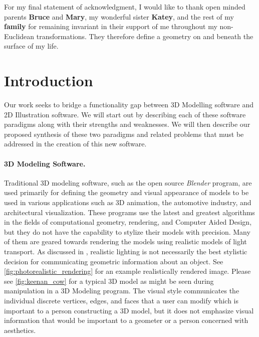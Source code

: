 \documentclass[12pt, letterpaper]{article}
\begin{document}
For my final statement of acknowledgment, I would like to thank open minded parents \textbf{Bruce} and \textbf{Mary},
my wonderful sister \textbf{Katey}, and the rest of my \textbf{family} for remaining
invariant in their support of me throughout my non-Euclidean transformations. They therefore define a geometry on and beneath the surface of my life.


\newpage
\doublespacing
\tableofcontents
\newpage

\setcounter{page}{1}


\section{Introduction}

	Our work seeks to bridge a functionality gap between 3D Modelling software and 2D Illustration software. We will start out by describing each of these
	software paradigms along with their strengths and weaknesses. We will then describe our proposed synthesis of these two paradigms and related problems
	that must be addressed in the creation of this new software.


	\paragraph{3D Modeling Software.}

	Traditional 3D modeling software, such as the open source \emph{Blender} program, are used primarily for defining the geometry and visual appearance of models to be 
	used in various applications such as 3D animation, the automotive industry, and architectural visualization.
	These programs use the latest and greatest algorithms in the fields of computational geometry, rendering, and Computer Aided Design,
	but they do not have the capability to stylize their models with precision. Many of them are geared towards rendering the models using 
	realistic models of light transport. As discussed in \cite{JDA08}, realistic lighting is not necessarily the best stylistic decision for communicating
	geometric information about an object. See \ref{fig:photorealistic_rendering} for an example realistically rendered image.
	Please see \ref{fig:keenan_cow} for a typical 3D model as might be seen during manipulation in a 3D Modeling program. The visual style communicates
	the individual discrete vertices, edges, and faces that a user can modify which is important to a person constructing a 3D model, but it does not
	emphasize visual information that would be important to a geometer or a person concerned with aesthetics.
\end{document}
